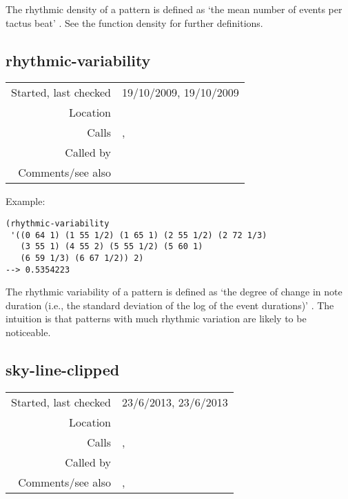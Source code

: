 \noindent The rhythmic density of a pattern is defined
as `the mean number of events per tactus beat'
\citep[p.~78]{pearce2007}. See the function density
for further definitions.


\subsection*{rhythmic-variability}\label{fun:rhythmic-variability}

\vspace{0.3cm}
\begin{tabular}{r|p{8cm}}
Started, last checked & 19/10/2009, 19/10/2009 \\
Location & \nameref{sec:musical-properties} \\
Calls & \nameref{fun:nth-list-of-lists}, \nameref{fun:sd} \\
Called by & \\
Comments/see also &
\end{tabular}

\vspace{0.5cm}
\noindent Example:
\begin{verbatim}
(rhythmic-variability
 '((0 64 1) (1 55 1/2) (1 65 1) (2 55 1/2) (2 72 1/3)
   (3 55 1) (4 55 2) (5 55 1/2) (5 60 1)
   (6 59 1/3) (6 67 1/2)) 2)
--> 0.5354223
\end{verbatim}

\noindent The rhythmic variability of a pattern is
defined as `the degree of change in note duration
(i.e., the standard deviation of the log of the event
durations)' \citep[p.~78]{pearce2007}. The intuition
is that patterns with much rhythmic variation are
likely to be noticeable.


\subsection*{sky-line-clipped}\label{fun:sky-line-clipped}

\vspace{0.3cm}
\begin{tabular}{r|p{8cm}}
Started, last checked & 23/6/2013, 23/6/2013 \\
Location & \nameref{sec:musical-properties} \\
Calls & \nameref{fun:nth-list-of-lists}, \nameref{fun:replace-nth-in-list-with-x} \\
Called by & \nameref{fun:monophonise} \\
Comments/see also & \nameref{fun:top-line}, \nameref{fun:top-line-verbose}
\end{tabular}

